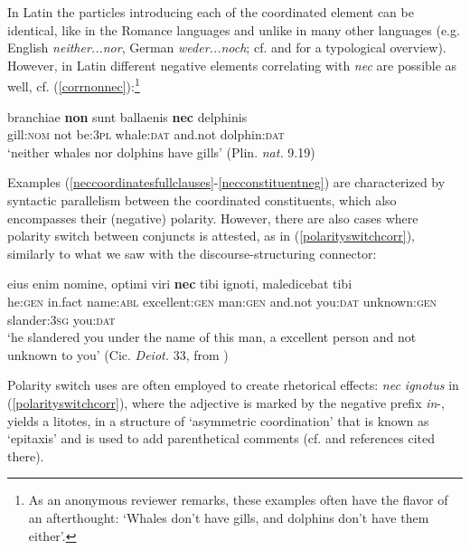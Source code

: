 \documentclass[output=paper,modfonts,nonflat,citecolor=brown,
showindex
]{langsci/langscibook}
\begin{document}
\noindent In Latin the particles introducing each of the coordinated element can be identical, like in the Romance languages and unlike in many other languages (e.g. English {\emph{neither...nor}}, German {\emph{weder...noch}}; cf. \citealt[100-106]{BerniniRamat96} and \citealt{Haspelmath07} for a typological overview). However, in Latin different negative elements correlating with {\emph{nec}} are possible as well, cf. (\ref{corrnonnec}):{\footnote{As an anonymous reviewer remarks, these examples often have the flavor of an afterthought: `Whales don't have gills, and dolphins don't have them either'.}}

{\begin{exe}
\ex \label{corrnonnec} \gll branchiae {\textbf{non}} sunt ballaenis {\textbf{nec}} delphinis\\
gill:{\textsc{nom}} not be:{\textsc{3pl}} whale:{\textsc{dat}} and.not dolphin:{\textsc{dat}}\\

`neither whales nor dolphins have gills' (Plin. {\emph{nat.}} 9.19)
\end{exe}}

\noindent Examples (\ref{neccoordinatesfullclauses}-\ref{necconstituentneg}) are characterized by syntactic parallelism between the coordinated constituents, which also encompasses their (negative) polarity. However, there are also cases where polarity switch between conjuncts is attested, as in (\ref{polarityswitchcorr}), similarly to what we saw with the discourse-structuring connector:

{\begin{exe}
\ex \label{polarityswitchcorr} \gll eius enim nomine, optimi viri {\textbf{nec}} tibi ignoti, maledicebat tibi\\
he:{\textsc{gen}} in.fact name:{\textsc{abl}} excellent:{\textsc{gen}} man:{\textsc{gen}} and.not you:{\textsc{dat}} unknown:{\textsc{gen}} slander:{\textsc{3sg}} you:{\textsc{dat}}\\

`he slandered you under the name of this man, a excellent person and not unknown to you' (Cic. {\emph{Deiot.}} 33, from \citealt[688]{Pinkster15})
\end{exe}}

\noindent Polarity switch uses are often employed to create rhetorical effects: {\emph{nec ignotus}} in (\ref{polarityswitchcorr}), where the adjective is marked by the negative prefix {\emph{in}}-, yields a litotes, in a structure of `asymmetric coordination' that is known as `epitaxis' and is used to add parenthetical comments (cf. \citealt[]{OrlandiniPoccetti07} and references cited there). 
\end{document}
